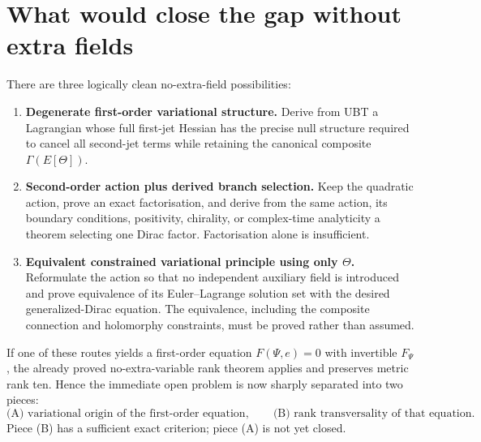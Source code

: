 \documentclass[11pt,a4paper]{article}
\begin{document}
\section{What would close the gap without extra fields}
There are three logically clean no-extra-field possibilities:
\begin{enumerate}
\item \textbf{Degenerate first-order variational structure.} Derive from UBT a
Lagrangian whose full first-jet Hessian has the precise null structure required
to cancel all second-jet terms while retaining the canonical composite
$\Gamma(E[\Theta])$.
\item \textbf{Second-order action plus derived branch selection.} Keep the
quadratic action, prove an exact factorisation, and derive from the same action,
its boundary conditions, positivity, chirality, or complex-time analyticity a
theorem selecting one Dirac factor.  Factorisation alone is insufficient.
\item \textbf{Equivalent constrained variational principle using only
$\Theta$.} Reformulate the action so that no independent auxiliary field is
introduced and prove equivalence of its Euler--Lagrange solution set with the
desired generalized-Dirac equation.  The equivalence, including the composite
connection and holomorphy constraints, must be proved rather than assumed.
\end{enumerate}

If one of these routes yields a first-order equation
$F(\Psi,e)=0$ with invertible $F_\Psi$, the already proved no-extra-variable
rank theorem applies and preserves metric rank ten.  Hence the immediate open
problem is now sharply separated into two pieces:
\[
\text{(A) variational origin of the first-order equation},
\qquad
\text{(B) rank transversality of that equation}.
\]
Piece (B) has a sufficient exact criterion; piece (A) is not yet closed.
\end{document}
